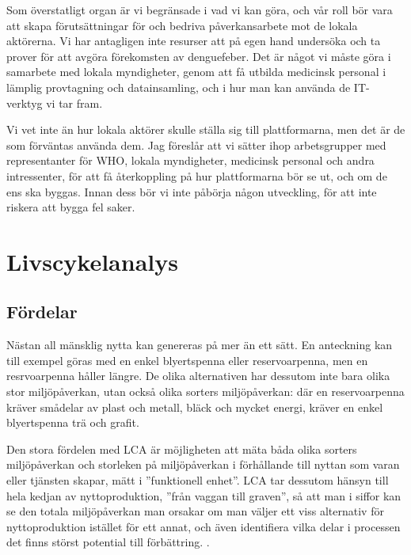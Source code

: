 \documentclass{article}
\begin{document}
Som överstatligt organ är vi begränsade i vad vi kan göra, och vår roll bör vara att skapa förutsättningar för och bedriva påverkansarbete mot de lokala aktörerna. Vi har antagligen inte resurser att på egen hand undersöka och ta prover för att avgöra förekomsten av denguefeber. Det är något vi måste göra i samarbete med lokala myndigheter, genom att få utbilda medicinsk personal i lämplig provtagning och datainsamling, och i hur man kan använda de IT-verktyg vi tar fram.

Vi vet inte än hur lokala aktörer skulle ställa sig till plattformarna, men det är de som förväntas använda dem. Jag föreslår att vi sätter ihop arbetsgrupper med representanter för WHO, lokala myndigheter, medicinsk personal och andra intressenter, för att få återkoppling på hur plattformarna bör se ut, och om de ens ska byggas. Innan dess bör vi inte påbörja någon utveckling, för att inte riskera att bygga fel saker.




\clearpage
\section{Livscykelanalys}

\subsection{Fördelar}

Nästan all mänsklig nytta kan genereras på mer än ett sätt. En anteckning kan till exempel göras med en enkel blyertspenna eller reservoarpenna, men en resrvoarpenna håller längre. De olika alternativen har dessutom inte bara olika stor miljöpåverkan, utan också olika sorters miljöpåverkan: där en reservoarpenna kräver smådelar av plast och metall, bläck och mycket energi, kräver en enkel blyertspenna trä och grafit. 

Den stora fördelen med LCA är möjligheten att mäta båda olika sorters miljöpåverkan och storleken på miljöpåverkan i förhållande till nyttan som varan eller tjänsten skapar, mätt i ''funktionell enhet''. LCA tar dessutom hänsyn till hela kedjan av nyttoproduktion, ''från vaggan till graven'', så att man i siffor kan se den totala miljöpåverkan man orsakar om man väljer ett viss alternativ för nyttoproduktion istället för ett annat, och även identifiera vilka delar i processen det finns störst potential till förbättring.  .
\end{document}
